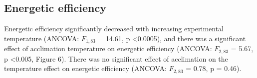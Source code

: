 \documentclass[../../Paper.tex]{subfiles}
\begin{document}
\subsection*{Energetic efficiency}

Energetic efficiency significantly decreased with increasing experimental 
temperature (ANCOVA: $F_{1,83}$ = 14.61, p \textless  0.0005), and there was a 
significant effect of acclimation temperature on energetic efficiency 
(ANCOVA: $F_{2,83}$ = 5.67, p \textless  0.005, Figure 6). There was no significant effect of
acclimation on the temperature effect on energetic efficiency (ANCOVA: $F_{2,83}$ = 0.78, 
p = 0.46). 
\end{document}
